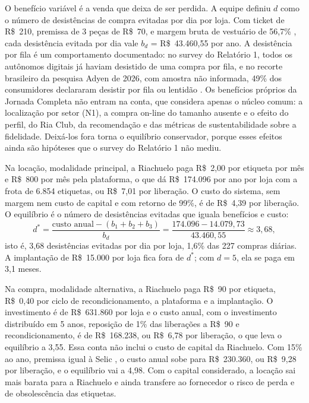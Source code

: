 O benefício variável é a venda que deixa de ser perdida. A equipe definiu $d$ como o número de desistências de compra evitadas por dia por loja. Com ticket de R\$~210, premissa de 3 peças de R\$~70, e margem bruta de vestuário de 56,7\% \cite{abvtex2026riachuelo}, cada desistência evitada por dia vale $b_d$ = R\$~43.460,55 por ano. A desistência por fila é um comportamento documentado: no survey do Relatório 1, todos os autônomos digitais já haviam desistido de uma compra por fila, e no recorte brasileiro da pesquisa Adyen de 2026, com amostra não informada, 49\% dos consumidores declararam desistir por fila ou lentidão \cite{tiinside2026adyen}. Os benefícios próprios da Jornada Completa não entram na conta, que considera apenas o núcleo comum: a localização por setor (N1), a compra on-line do tamanho ausente e o efeito do perfil, do Ria Club, da recomendação e das métricas de sustentabilidade sobre a fidelidade. Deixá-los fora torna o equilíbrio conservador, porque esses efeitos ainda são hipóteses que o survey do Relatório 1 não mediu.

Na locação, modalidade principal, a Riachuelo paga R\$~2,00 por etiqueta por mês e R\$~800 por mês pela plataforma, o que dá R\$~174.096 por ano por loja com a frota de 6.854 etiquetas, ou R\$~7,01 por liberação. O custo do sistema, sem margem nem custo de capital e com retorno de 99\%, é de R\$~4,39 por liberação. O equilíbrio é o número de desistências evitadas que iguala benefícios e custo:
\begin{equation}
d^{*} = \frac{\text{custo anual} - (b_1 + b_2 + b_3)}{b_d} = \frac{174.096 - 14.079{,}73}{43.460{,}55} \approx 3{,}68,
\end{equation}
isto é, 3,68 desistências evitadas por dia por loja, 1,6\% das 227 compras diárias. A implantação de R\$~15.000 por loja fica fora de $d^{*}$; com $d = 5$, ela se paga em 3,1 meses.

Na compra, modalidade alternativa, a Riachuelo paga R\$~90 por etiqueta, R\$~0,40 por ciclo de recondicionamento, a plataforma e a implantação. O investimento é de R\$~631.860 por loja e o custo anual, com o investimento distribuído em 5 anos, reposição de 1\% das liberações a R\$~90 e recondicionamento, é de R\$~168.238, ou R\$~6,78 por liberação, o que leva o equilíbrio a 3,55. Essa conta não inclui o custo de capital da Riachuelo. Com 15\% ao ano, premissa igual à Selic \cite{btg2025guararapes}, o custo anual sobe para R\$~230.360, ou R\$~9,28 por liberação, e o equilíbrio vai a 4,98. Com o capital considerado, a locação sai mais barata para a Riachuelo e ainda transfere ao fornecedor o risco de perda e de obsolescência das etiquetas.

